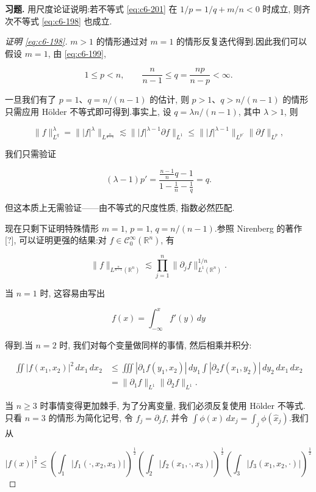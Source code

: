 \textbf{习题.} 用尺度论证说明:若不等式 \eqref{eq:c6-201} 在 $1/p = 1/q + m/n < 0$ 时成立, 则齐次不等式 \eqref{eq:c6-198} 也成立.

\begin{proof}[证明 \eqref{eq:c6-198}]
$m>1$ 的情形通过对 $m=1$ 的情形反复迭代得到.因此我们可以假设 $m=1$, 由 \eqref{eq:c6-199},

\[
1\le p < n, \qquad \frac{n}{n-1}\le q = \frac{np}{n-p}<\infty.
\]

一旦我们有了 $p=1$、$q = n/(n-1)$ 的估计, 则 $p>1$、$q > n/(n-1)$ 的情形只需应用 Hölder 不等式即可得到.事实上, 设 $q = \lambda n/(n-1)$, 其中 $\lambda>1$, 则

\[
\|f\|_{L^q}^\lambda = \||f|^\lambda\|_{L^{\frac{n}{n-1}}} \lesssim \||f|^{\lambda-1}\partial f\|_{L^1} \le \||f|^{\lambda-1}\|_{L^{p'}}\|\partial f\|_{L^p},
\]

我们只需验证

\[
(\lambda-1)p' = \frac{\frac{n-1}{n}q - 1}{1 - \frac{1}{n} - \frac{1}{q}} = q.
\]

但这本质上无需验证——由不等式的尺度性质, 指数必然匹配.

现在只剩下证明特殊情形 $m=1$, $p=1$, $q = n/(n-1)$.参照 Nirenberg 的著作[?], 可以证明更强的结果:对 $f\in\mathcal{C}_0^\infty(\mathbb{R}^n)$, 有

\begin{equation}
\|f\|_{L^{\frac{n}{n-1}}(\mathbb{R}^n)} \lesssim \prod_{j=1}^n\|\partial_j f\|_{L^1(\mathbb{R}^n)}^{1/n}.\label{eq:c6-202}
\end{equation}

当 $n=1$ 时, 这容易由写出

\[
f(x) = \int_{-\infty}^x f'(y)\, dy
\]

得到.当 $n=2$ 时, 我们对每个变量做同样的事情, 然后相乘并积分:

\[
\begin{aligned}
\iint|f(x_1, x_2)|^2\, dx_1\, dx_2 &\le \iiint|\partial_1 f(y_1, x_2)|\, dy_1\int|\partial_2 f(x_1, y_2)|\, dy_2\, dx_1\, dx_2 \\
&= \|\partial_1 f\|_{L^1}\|\partial_2 f\|_{L^1}.
\end{aligned}
\]

当 $n\ge 3$ 时事情变得更加棘手, 为了分离变量, 我们必须反复使用 Hölder 不等式.只看 $n=3$ 的情形.为简化记号, 令 $f_j = \partial_j f$, 并令 $\int\phi(x)\, dx_j = \int_j\phi(\hat{x}_j)$.我们从

\[
|f(x)|^{\frac{3}{2}} \le \left(\int_1|f_1(\cdot, x_2, x_3)|\right)^{\frac{1}{2}}\left(\int_2|f_2(x_1, \cdot, x_3)|\right)^{\frac{1}{2}}\left(\int_3|f_3(x_1, x_2, \cdot)|\right)^{\frac{1}{2}}
\]


\end{proof}
